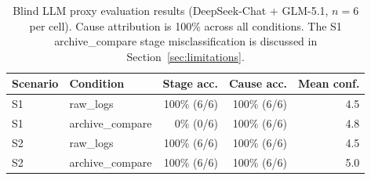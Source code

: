 \documentclass[11pt]{article}
\begin{document}
\begin{table}[t!]
  \centering
  \small
  \begin{tabular}{llrrr}
    \toprule
    \textbf{Scenario} & \textbf{Condition} & \textbf{Stage acc.} & \textbf{Cause acc.} & \textbf{Mean conf.} \\
    \midrule
    S1 & raw\_logs        & 100\% (6/6) & 100\% (6/6) & 4.5 \\
    S1 & archive\_compare &   0\% (0/6) & 100\% (6/6) & 4.8 \\
    S2 & raw\_logs        & 100\% (6/6) & 100\% (6/6) & 4.5 \\
    S2 & archive\_compare & 100\% (6/6) & 100\% (6/6) & 5.0 \\
    \bottomrule
  \end{tabular}
  \caption{Blind LLM proxy evaluation results (DeepSeek-Chat + GLM-5.1, $n{=}6$ per cell). Cause attribution is 100\% across all conditions. The S1 archive\_compare stage misclassification is discussed in Section~\ref{sec:limitations}.}
  \label{tab:llm-eval}
\end{table}
\end{document}
